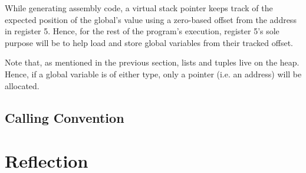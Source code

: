 While generating assembly code, a virtual stack pointer keeps track of the expected position of the global's value using a zero-based offset from the address in register 5.
Hence, for the rest of the program's execution, register 5's sole purpose will be to help load and store global variables from their tracked offset.

Note that, as mentioned in the previous section, lists and tuples live on the heap. Hence, if a global variable is of either type, only a pointer (i.e. an address) will be allocated.


\subsection{Calling Convention}





\section{Reflection}


